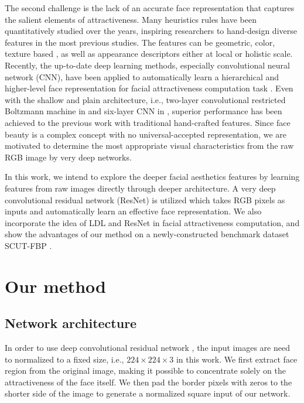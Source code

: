 \documentclass[preprint,5p,times,twocolumn]{elsarticle}
\begin{document}
The second challenge is the lack of an accurate face representation that captures the salient elements of attractiveness. Many heuristics rules have been quantitatively studied over the years, inspiring researchers to hand-design diverse features in the most previous studies. The features can be geometric, color, texture based \cite{NC06_Eisenthal,NIPS06_Kagian,PR08_Schmid}, as well as appearance descriptors \cite{ECCV10_Gray,PRIACVA12_Bottino} either at local or holistic scale. Recently, the up-to-date deep learning methods, especially convolutional neural network (CNN), have been applied to automatically learn a hierarchical and higher-level face representation for facial attractiveness computation task \cite{Neucom14_Gan,arXiv15_Xu}. Even with the shallow and plain architecture, i.e., two-layer convolutional restricted Boltzmann machine in \cite{Neucom14_Gan} and six-layer CNN in \cite{arXiv15_Xu}, superior performance has been achieved to the previous work with traditional hand-crafted features. Since face beauty is a complex concept with no universal-accepted representation, we are motivated to determine the most appropriate visual characteristics from the raw RGB image by very deep networks.

In this work, we intend to explore the deeper facial aesthetics features by learning features from raw images directly through deeper architecture. A very deep convolutional residual network (ResNet) \cite{CVPR16_ResNet} is utilized which takes RGB pixels as inputs and automatically learn an effective face representation. We also incorporate the idea of LDL and ResNet in facial attractiveness computation, and show the advantages of our method on a newly-constructed benchmark dataset SCUT-FBP \cite{SMC15_Xie}.




\section{Our method}
\subsection{Network architecture}
In order to use deep convolutional residual network \cite{CVPR16_ResNet}, the input images are need to normalized to a fixed size, i.e., $224 \times 224 \times 3$ in this work. We first extract face region from the original image, making it possible to concentrate solely on the attractiveness of the face itself. We then pad the border pixels with zeros to the shorter side of the image to generate a normalized square input of our network.
\end{document}
